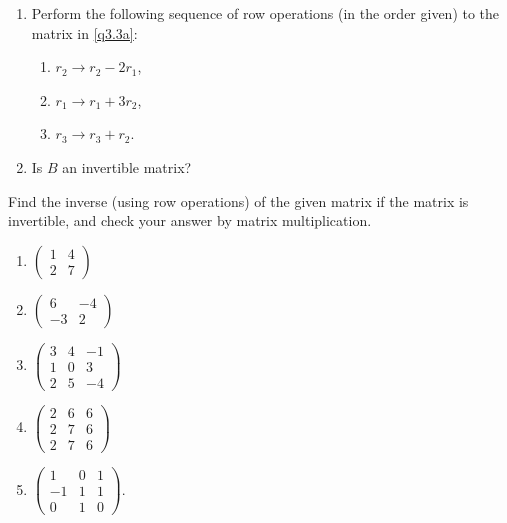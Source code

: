 \documentclass[english,12pt,a4paper]{scrartcl}
\newenvironment{modenumerate}
  {\enumerate\setupmodenumerate}
  {\endenumerate}
\newif\ifmoditem
\newcommand{\setupmodenumerate}{%
  \global\moditemfalse
  \let\origmakelabel\makelabel
  \def\moditem##1{\global\moditemtrue\def\mesymbol{##1}\item}%
  \def\makelabel##1{%
  \origmakelabel{##1\ifmoditem\rlap{\mesymbol}\fi\enspace}%
\global\moditemfalse}%
}
\begin{document}
\begin{modenumerate}
\begin{enumerate}[label=(\alph*),ref=(\alph*)]
      \item \label{q3.3b} Perform the following sequence of row operations (in 
        the order given) to the matrix in \ref{q3.3a}:
        \begin{multicols}{3}[\setlength{\columnseprule}{0pt}]
          \begin{enumerate}[label=(\roman*),ref=(\roman*)]
            \item $r_2 \to r_2 - 2r_1$,
            \item $r_1 \to r_1 + 3r_2$,
            \item $r_3 \to r_3 + r_2$.
          \end{enumerate}
        \end{multicols}
      \item Is $B$ an invertible matrix?
    \end{enumerate}
  \moditem{*} Find the inverse (using row operations) of the given matrix if 
  the matrix is invertible, and check your answer by matrix multiplication.
    \begin{multicols}{3}[\setlength{\columnseprule}{0pt}]
      \begin{enumerate}
        \item $
          \begin{pmatrix}
            1 & 4 \\
            2 & 7
          \end{pmatrix}
          $
        \item $
          \begin{pmatrix}
            6 & -4 \\
            -3 & 2
          \end{pmatrix}
          $
        \item $
          \begin{pmatrix}
            3 & 4 & -1 \\
            1 & 0 & 3 \\
            2 & 5 & -4
          \end{pmatrix}
          $
        \item $
          \begin{pmatrix}
            2 & 6 & 6 \\
            2 & 7 & 6 \\
            2 & 7 & 6
          \end{pmatrix}
          $
        \item $
          \begin{pmatrix}
            1 & 0 & 1 \\
            -1 & 1 & 1 \\
            0 & 1 & 0
          \end{pmatrix}
          $.
      \end{enumerate}
    \end{multicols}
\end{modenumerate}
\end{document}

